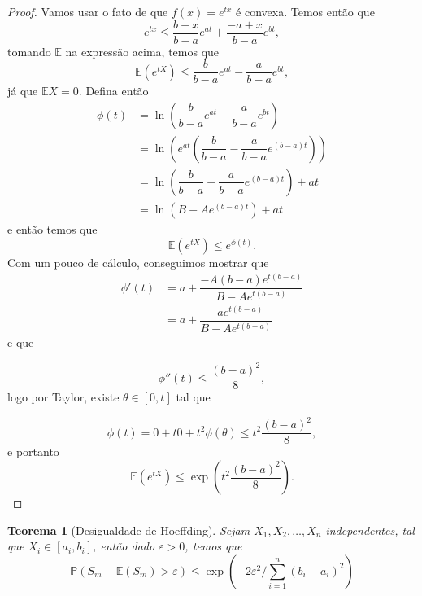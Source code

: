 \documentclass[12pt,a4paper,oneside]{book}
\newtheorem{theorem}{Teorema}[section]
\theoremstyle{definition}
\theoremstyle{remark}
\numberwithin{equation}{section}
\newcommand{\e}{\varepsilon}
\newcommand{\E}{\mathbb{E}}
\newcommand{\pr}{\mathbb{P}}
\begin{document}
\begin{proof}
Vamos usar o fato de que $f(x)=e^{tx}$ é convexa. Temos então que 
$$e^{tx}\leq\dfrac{b-x}{b-a}e^{at}+\dfrac{-a+x}{b-a}e^{bt}, $$
tomando $\E$ na expressão acima, temos que
$$\E(e^{tX})\leq\dfrac{b}{b-a}e^{at}-\dfrac{a}{b-a}e^{bt},  $$
já que $\E X=0.$ Defina então 
\begin{align*}
\phi(t) &= \ln\left(\dfrac{b}{b-a}e^{at}-\dfrac{a}{b-a}e^{bt}\right)\\
 &= \ln\left(e^{at}\left( \dfrac{b}{b-a}-\dfrac{a}{b-a}e^{(b-a)t}\right)\right)\\
 &= \ln\left(\dfrac{b}{b-a}-\dfrac{a}{b-a}e^{(b-a)t}\right)+at\\
 &= \ln\left(B-Ae^{(b-a)t}\right)+at
\end{align*}
e então temos que
$$\E(e^{tX})\leq e^{\phi(t)}. $$
Com um pouco de cálculo, conseguimos mostrar que 
\begin{align*}
\phi'(t) &= a + \dfrac{-A(b-a)e^{t(b-a)}}{B-Ae^{t(b-a)}}\\
		 &= a + \dfrac{-ae^{t(b-a)}}{B-Ae^{t(b-a)}} 
\end{align*}
e que

$$\phi''(t)\leq \dfrac{(b-a)^2}{8}, $$logo por Taylor, existe $\theta\in[0,t]$ tal que

$$\phi(t) = 0+t0+t^2\phi(\theta)\leq t^2\dfrac{(b-a)^2}{8},  $$
e portanto
$$\E(e^{tX})\leq  \exp\left(t^2\dfrac{(b-a)^2}{8}\right).$$
\end{proof}


\begin{theorem}[Desigualdade de Hoeffding] \label{des-hoeff}Sejam $X_1,X_2,\dots,X_n$ independentes, tal que $X_i\in[a_i,b_i]$, então dado $\e>0$, temos que
$$\pr(S_m -\E(S_m)>\e)\leq \exp({-2\e^2/\sum_{i=1}^n(b_i-a_i)^2}) $$
\end{theorem}
\end{document}
